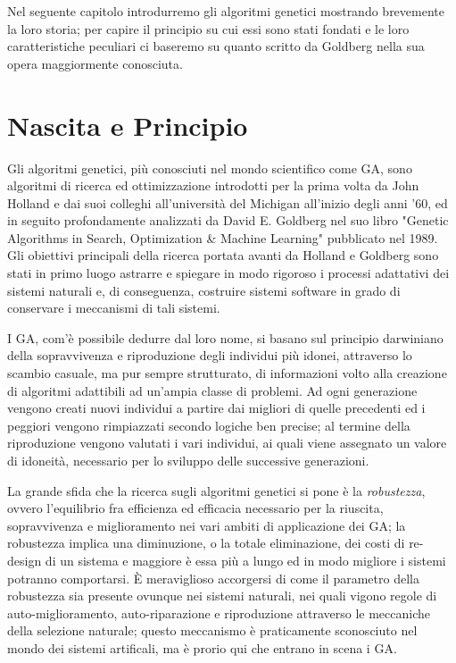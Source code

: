 
Nel seguente capitolo introdurremo gli algoritmi genetici mostrando brevemente la loro storia; per capire il principio su cui essi sono stati fondati e le loro caratteristiche peculiari ci baseremo su quanto scritto da Goldberg \cite{goldberg1} nella sua opera maggiormente conosciuta.
\section{Nascita e Principio}
Gli algoritmi genetici, pi\`u conosciuti nel mondo scientifico come GA, sono algoritmi di ricerca ed ottimizzazione introdotti per la prima volta da John Holland e dai suoi colleghi all'universit\`a del Michigan all'inizio degli anni '60, ed in seguito profondamente analizzati da David E. Goldberg nel suo libro "Genetic Algorithms in Search, Optimization \& Machine Learning" pubblicato nel 1989. Gli obiettivi principali della ricerca portata avanti da Holland e Goldberg sono stati in primo luogo astrarre e spiegare in modo rigoroso i processi adattativi dei sistemi naturali e, di conseguenza, costruire sistemi software in grado di conservare i meccanismi di tali sistemi.
\vspace{3mm}

I GA, com'\`e possibile dedurre dal loro nome, si basano sul principio darwiniano della sopravvivenza e riproduzione degli individui pi\`u idonei, attraverso lo scambio casuale, ma pur sempre strutturato, di informazioni volto alla creazione di algoritmi adattibili ad un'ampia  classe di problemi. Ad ogni generazione vengono creati nuovi individui a partire dai migliori di quelle precedenti ed i peggiori vengono rimpiazzati secondo logiche ben precise; al termine della riproduzione vengono valutati i vari individui, ai quali viene assegnato un valore di idoneit\`a, necessario per lo sviluppo delle successive generazioni.

La grande sfida che la ricerca sugli algoritmi genetici si pone \`e la \textit{robustezza}, ovvero l'equilibrio fra efficienza ed efficacia necessario per la riuscita, sopravvivenza e miglioramento nei vari ambiti di applicazione dei GA; la robustezza implica una diminuzione, o la totale eliminazione, dei costi di re-design di un sistema e maggiore \`e essa pi\`u a lungo ed in modo migliore i sistemi potranno comportarsi. \`E meraviglioso accorgersi di come il parametro della robustezza sia presente ovunque nei sistemi naturali, nei quali vigono regole di auto-miglioramento, auto-riparazione e riproduzione attraverso le meccaniche della selezione naturale; questo meccanismo \`e praticamente sconosciuto nel mondo dei sistemi artificali, ma \`e prorio qui che entrano in scena i GA.
